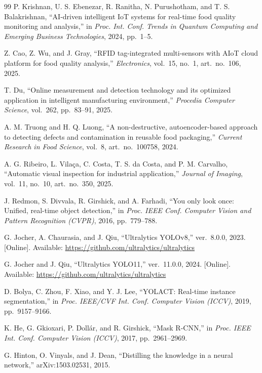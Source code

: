 \begin{thebibliography}{99}
P. Krishnan, U. S. Ebenezar, R. Ranitha, N. Purushotham, and T. S. Balakrishnan,
``AI-driven intelligent IoT systems for real-time food quality monitoring and analysis,''
in \emph{Proc. Int. Conf. Trends in Quantum Computing and Emerging Business Technologies}, 2024, pp.~1--5.

Z. Cao, Z. Wu, and J. Gray,
``RFID tag-integrated multi-sensors with AIoT cloud platform for food quality analysis,''
\emph{Electronics}, vol.~15, no.~1, art.~no.~106, 2025.

T. Du,
``Online measurement and detection technology and its optimized application in intelligent manufacturing environment,''
\emph{Procedia Computer Science}, vol.~262, pp.~83--91, 2025.

A. M. Truong and H. Q. Luong,
``A non-destructive, autoencoder-based approach to detecting defects and contamination in reusable food packaging,''
\emph{Current Research in Food Science}, vol.~8, art.~no.~100758, 2024.

A. G. Ribeiro, L. Vila\c{c}a, C. Costa, T. S. da Costa, and P. M. Carvalho,
``Automatic visual inspection for industrial application,''
\emph{Journal of Imaging}, vol.~11, no.~10, art.~no.~350, 2025.

J. Redmon, S. Divvala, R. Girshick, and A. Farhadi,
``You only look once: Unified, real-time object detection,''
in \emph{Proc. IEEE Conf. Computer Vision and Pattern Recognition (CVPR)}, 2016, pp.~779--788.

G. Jocher, A. Chaurasia, and J. Qiu,
``Ultralytics YOLOv8,'' ver.~8.0.0, 2023. [Online]. Available: \url{https://github.com/ultralytics/ultralytics}

G. Jocher and J. Qiu,
``Ultralytics YOLO11,'' ver.~11.0.0, 2024. [Online]. Available: \url{https://github.com/ultralytics/ultralytics}

D. Bolya, C. Zhou, F. Xiao, and Y. J. Lee,
``YOLACT: Real-time instance segmentation,''
in \emph{Proc. IEEE/CVF Int. Conf. Computer Vision (ICCV)}, 2019, pp.~9157--9166.

K. He, G. Gkioxari, P. Doll\'ar, and R. Girshick,
``Mask R-CNN,''
in \emph{Proc. IEEE Int. Conf. Computer Vision (ICCV)}, 2017, pp.~2961--2969.

G. Hinton, O. Vinyals, and J. Dean,
``Distilling the knowledge in a neural network,''
arXiv:1503.02531, 2015.


\end{thebibliography}
